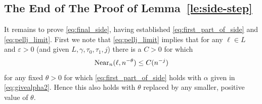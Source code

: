 \documentclass{memo-l}
\theoremstyle{plain}
\theoremstyle{definition}
\numberwithin{section}{chapter}
\numberwithin{equation}{chapter}
\theoremstyle{plain}
\theoremstyle{definition}
\begin{document}
% 
% 
% 
% 
% 
% 

%
%
%
%
\subsection{The End of The Proof of Lemma~\ref{le:side-step}}

It remains to prove \eqref{eq:final_side}, having established
\eqref{eq:first_part_of_side} and \eqref{eq:pellj_limit}.  First we note
that \eqref{eq:pellj_limit} implies that for any $\ell\in L$ and
$\varepsilon>0$ (and given $L,\gamma,\tau_0,\tau_1,j$) there is a $C>0$ for
which \begin{equation}\label{eq:thetaNear} {\rm Near}_n(\ell,n^{-\theta})
\leq C (n^{-j}) \end{equation} for any fixed $\theta>0$ for which
\eqref{eq:first_part_of_side} holds with $\alpha$ given in
\eqref{eq:givealpha2}.  Hence this also holds with $\theta$ replaced by any
smaller, positive value of $\theta$.
\end{document}
